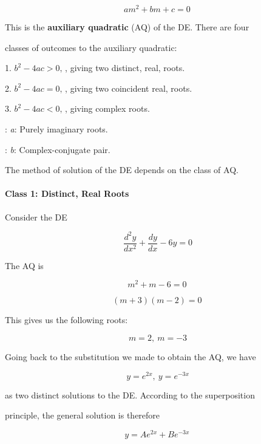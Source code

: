 $$am^2+bm+c=0 \,$$



This is the \textbf{auxiliary quadratic} (AQ) of the DE. There are four

classes of outcomes to the auxiliary quadratic:



1.  $b^2-4ac > 0, \,$, giving two distinct, real, roots.

2.  $b^2-4ac = 0, \,$, giving two coincident real, roots.

3.  $b^2-4ac < 0, \,$, giving complex roots.



:   \textit{a}: Purely imaginary roots.

:   \textit{b}: Complex-conjugate pair.



The method of solution of the DE depends on the class of AQ.



\paragraph{Class 1: Distinct, Real Roots}



Consider the DE



$$\frac{d^2y}{dx^2}+\frac{dy}{dx}-6y=0$$



The AQ is



$$m^2+m-6=0 \,$$



$$(m+3)(m-2)=0 \,$$



This gives us the following roots:



$$m=2, \ m=-3$$



Going back to the substitution we made to obtain the AQ, we have



$$y=e^{2x},\ y=e^{-3x}$$



as two distinct solutions to the DE. According to the superposition

principle, the general solution is therefore



$$y=Ae^{2x}+Be^{-3x} \,$$



